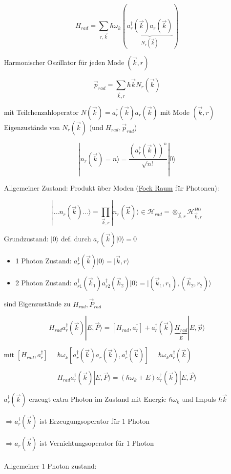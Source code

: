 \[\boxed{H_{rad} = \sum_{r,\vec k} \hbar\omega_k(\underbrace{a_r^\dagger (\vec k)a_r(\vec k)}_{N_r(\vec k)}) } \]

Harmonischer Oszillator für jeden Mode \((\vec k,r)\)

\[\vec p_{rad} = \sum_{\vec k,r} \hbar\vec k N_r(\vec k)\]

mit Teilchenzahloperator \(N(\vec k) = a^\dagger_r(\vec k)a_r(\vec k)\) mit Mode \((\vec k,r)\) Eigenzustände von \(N_r(\vec k)\) (und \(H_{rad},\vec p_{rad}\))

\[|n_r(\vec k)=n\rangle  = \frac{(a^\dagger_r(\vec k))^n}{\sqrt{n!}}|0\rangle \]


Allgemeiner Zustand: Produkt über Moden (\underline{Fock Raum} für Photonen):

\[|... n_r(\vec k)...\rangle  = \prod_{\vec k,r}|n_r(\vec k)\rangle \in \mathcal H_{rad} = \otimes_{\vec k,r}\mathcal H_{\vec k,r}^{H0}\]

Grundzustand: \(|0\rangle \) def. durch \(a_r(\vec k)|0\rangle =0\)

\begin{itemize}
\item 1 Photon Zustand: \(a^\dagger_r(\vec k) |0\rangle = |\vec k,r\rangle  \)
\item 2 Photon Zustand: \(a^\dagger_{r1} (\vec k_1) a^\dagger_{r2} (\vec k_2)   |0\rangle = |(\vec k_1,r_1),(\vec k_2,r_2)\rangle   \)
\end{itemize}

sind Eigenzustände zu \(H_{rad},\vec P_{rad}\)

\[ H_{rad}a^\dagger_r(\vec k) |E,\vec P\rangle  =  [H_{rad},a^\dagger_r]+a^\dagger_r(\vec k)\underbrace{H_{rad}}_{E}|E,\vec p\rangle \]


mit \([H_{rad},a^\dagger_r] = \hbar\omega_k[a^\dagger_r(\vec k) a_r(\vec k),a^\dagger_r(\vec k)] =\hbar\omega_k a^\dagger_r(\vec k)  \)

\[ H_{rad}a^\dagger_r(\vec k) |E,\vec P\rangle  = (\hbar\omega_k+E) a^\dagger_r(\vec k)|E,\vec P\rangle  \]

\( a^\dagger_r(\vec k) \) erzeugt extra Photon im Zustand mit Energie \(\hbar\omega_k\) und Impuls \(\hbar \vec k\)

\(\Rightarrow  a^\dagger_r(\vec k) \) ist Erzeugungsoperator für 1 Photon

\(\Rightarrow  a_r(\vec k) \) ist Vernichtungsoperator für 1 Photon\\
\\

Allgemeiner 1 Photon zustand:

